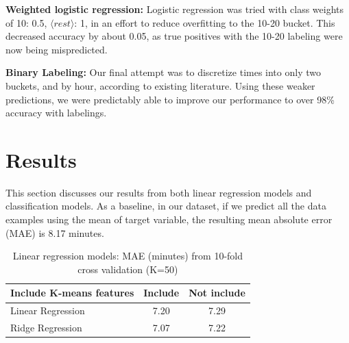 \documentclass[english]{article}
\begin{document}
{\bf Weighted logistic regression:}
Logistic regression was tried with class weights of {10: 0.5, $\langle rest \rangle$: 1}, in an effort to reduce overfitting to the 10-20 bucket. This decreased accuracy by about 0.05, as true positives with the 10-20 labeling were now being mispredicted.

{\bf Binary Labeling:}
Our final attempt was to discretize times into only two buckets, and by hour, according to existing literature. Using these weaker predictions, we were predictably able to improve our performance to over 98\% accuracy with labelings.


\section{Results}
\label{sec/results}

This section discusses our results from both linear regression models and classification models. As a baseline, in our dataset, if we predict all the data examples using the mean of target variable, the resulting mean absolute error (MAE) is 8.17 minutes.

\begin{table}
\centering
  \begin{tabular}{|l|c|c|}
  \hline
  Include K-means features  & Include & Not include \\
  \hline
  Linear Regression & 7.20                   & 7.29                        \\
  \hline
  Ridge Regression  & 7.07                   & 7.22                       \\
  \hline
  \end{tabular}
\caption{Linear regression models: MAE (minutes) from 10-fold cross validation (K=50)}
\label{tab/linres}
\end{table}

\end{document}
